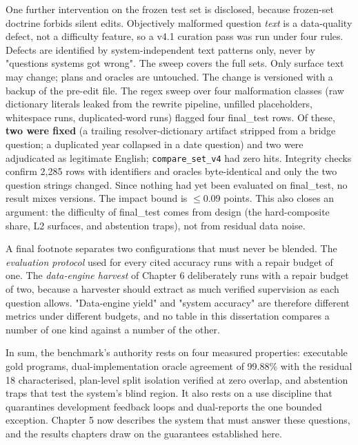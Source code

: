 \documentclass[10pt]{article} %
\begin{document}
One further intervention on the frozen test set is disclosed, because frozen-set doctrine forbids silent edits. Objectively malformed question \emph{text} is a data-quality defect, not a difficulty feature, so a v4.1 curation pass was run under four rules. Defects are identified by system-independent text patterns only, never by "questions systems got wrong". The sweep covers the full sets. Only surface text may change; plans and oracles are untouched. The change is versioned with a backup of the pre-edit file. The regex sweep over four malformation classes (raw dictionary literals leaked from the rewrite pipeline, unfilled placeholders, whitespace runs, duplicated-word runs) flagged four final\_test rows. Of these, \textbf{two were fixed} (a trailing resolver-dictionary artifact stripped from a bridge question; a duplicated year collapsed in a date question) and two were adjudicated as legitimate English; \texttt{compare\_set\_v4} had zero hits. Integrity checks confirm 2,285 rows with identifiers and oracles byte-identical and only the two question strings changed. Since nothing had yet been evaluated on final\_test, no result mixes versions. The impact bound is $\leq$0.09 points. This also closes an argument: the difficulty of final\_test comes from design (the hard-composite share, L2 surfaces, and abstention traps), not from residual data noise.

A final footnote separates two configurations that must never be blended. The \emph{evaluation protocol} used for every cited accuracy runs with a repair budget of one. The \emph{data-engine harvest} of Chapter 6 deliberately runs with a repair budget of two, because a harvester should extract as much verified supervision as each question allows. "Data-engine yield" and "system accuracy" are therefore different metrics under different budgets, and no table in this dissertation compares a number of one kind against a number of the other.

In sum, the benchmark's authority rests on four measured properties: executable gold programs, dual-implementation oracle agreement of 99.88\% with the residual 18 characterised, plan-level split isolation verified at zero overlap, and abstention traps that test the system's blind region. It also rests on a use discipline that quarantines development feedback loops and dual-reports the one bounded exception. Chapter 5 now describes the system that must answer these questions, and the results chapters draw on the guarantees established here.

\end{document}
